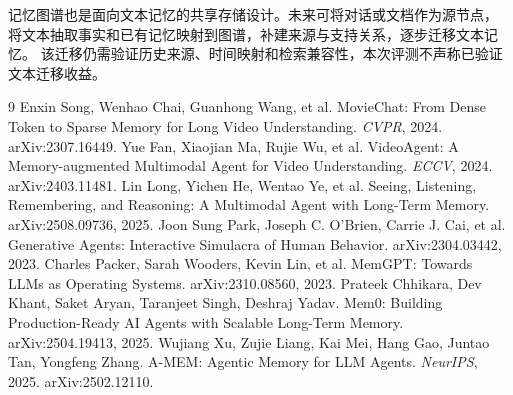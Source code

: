 \documentclass[UTF8,a4paper,11pt,fontset=fandol]{ctexart}
\begin{document}
记忆图谱也是面向文本记忆的共享存储设计。未来可将对话或文档作为源节点，
将文本抽取事实和已有记忆映射到图谱，补建来源与支持关系，逐步迁移文本记忆。
该迁移仍需验证历史来源、时间映射和检索兼容性，本次评测不声称已验证文本迁移收益。

\clearpage
\begin{thebibliography}{9}
 Enxin Song, Wenhao Chai, Guanhong Wang, et al.
MovieChat: From Dense Token to Sparse Memory for Long Video Understanding.
\textit{CVPR}, 2024. arXiv:2307.16449.
 Yue Fan, Xiaojian Ma, Rujie Wu, et al.
VideoAgent: A Memory-augmented Multimodal Agent for Video Understanding.
\textit{ECCV}, 2024. arXiv:2403.11481.
 Lin Long, Yichen He, Wentao Ye, et al.
Seeing, Listening, Remembering, and Reasoning: A Multimodal Agent with Long-Term Memory.
arXiv:2508.09736, 2025.
 Joon Sung Park, Joseph C. O'Brien, Carrie J. Cai, et al.
Generative Agents: Interactive Simulacra of Human Behavior.
arXiv:2304.03442, 2023.
 Charles Packer, Sarah Wooders, Kevin Lin, et al.
MemGPT: Towards LLMs as Operating Systems.
arXiv:2310.08560, 2023.
 Prateek Chhikara, Dev Khant, Saket Aryan, Taranjeet Singh, Deshraj Yadav.
Mem0: Building Production-Ready AI Agents with Scalable Long-Term Memory.
arXiv:2504.19413, 2025.
 Wujiang Xu, Zujie Liang, Kai Mei, Hang Gao, Juntao Tan, Yongfeng Zhang.
A-MEM: Agentic Memory for LLM Agents.
\textit{NeurIPS}, 2025. arXiv:2502.12110.
\end{thebibliography}
\end{document}

